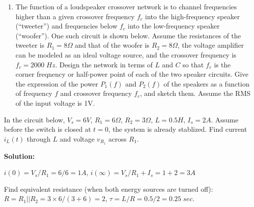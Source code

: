 \begin{enumerate}
\item The function of a loudspeaker crossover network is to channel 
  frequencies higher than a given crossover frequency $f_c$ into the
  high-frequency speaker (``tweeter'') and frequencies below $f_c$ into
  the low-frequency speaker (``woofer''). One such circuit is shown below.
  Assume the resistances of the tweeter is $R_1=8\Omega$ and that of the 
  woofer is $R_2=8\Omega$, the voltage amplifier can be modeled as an
  ideal voltage source, and the crossover frequency is $f_c=2000\; Hz$.
  Design the network in terms of $L$ and $C$ so that $f_c$ is the corner
  freqnency or half-power point of each of the two speaker circuits. Give 
  the expression of the power $P_1(f)$ and $P_2(f)$ of the speakers as a 
  function of frequency $f$ and crossover frequency $f_c$, and sketch them.
  Assume the RMS of the input voltage is 1V.


%   

\end{enumerate}


\item In the circuit below, $V_s=6V$, $R_1=6\Omega$, $R_2=3\Omega$,
$L=0.5H$, $I_s=2A$. Assume before the switch is closed at $t=0$, the
system is already stablized. Find current $i_L(t)$ through $L$ and 
voltage $v_{R_1}$ across $R_1$.


{\bf Solution:}

 $i(0)=V_s/R_1=6/6=1A$, $i(\infty)=V_s/R_1+I_s=1+2=3A$

 Find equivalent resistance (when both energy sources are turned off):
 $R=R_1 || R_2=3\times 6/(3+6)=2$, $\tau=L/R=0.5/2=0.25\;sec.$

